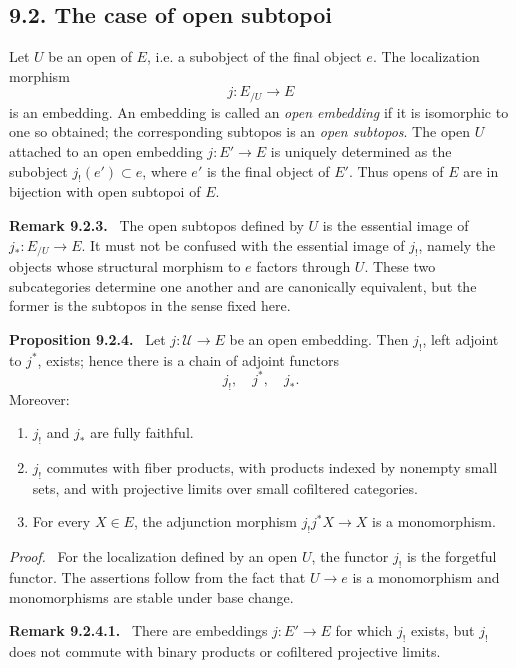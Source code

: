 \documentclass[11pt]{article}
\newcommand{\Uu}{\mathcal{U}}
\newenvironment{statement}[1]{\par\medskip\noindent\textbf{#1.}\ }{\par\medskip}
\newenvironment{remarktext}[1]{\par\medskip\noindent\textbf{#1.}\ }{\par\medskip}
\newenvironment{prooftext}{\par\noindent\emph{Proof.}\ }{\par\medskip}
\begin{document}
\subsection*{9.2. The case of open subtopoi}

Let \(U\) be an open of \(E\), i.e. a subobject of the final object \(e\). The localization morphism
\[
j:E_{/U}\longrightarrow E
\tag{9.2.2}
\]
is an embedding. An embedding is called an \emph{open embedding} if it is isomorphic to one so obtained; the corresponding subtopos is an \emph{open subtopos}. The open \(U\) attached to an open embedding \(j:E'\to E\) is uniquely determined as the subobject \(j_!(e')\subset e\), where \(e'\) is the final object of \(E'\). Thus opens of \(E\) are in bijection with open subtopoi of \(E\).

\begin{remarktext}{Remark 9.2.3}
The open subtopos defined by \(U\) is the essential image of \(j_*:E_{/U}\to E\). It must not be confused with the essential image of \(j_!\), namely the objects whose structural morphism to \(e\) factors through \(U\). These two subcategories determine one another and are canonically equivalent, but the former is the subtopos in the sense fixed here.
\end{remarktext}

\begin{statement}{Proposition 9.2.4}
Let \(j:\Uu\to E\) be an open embedding. Then \(j_!\), left adjoint to \(j^*\), exists; hence there is a chain of adjoint functors
\[
j_!,\quad j^*,\quad j_*.
\]
Moreover:
\begin{enumerate}[label=\alph*)]
\item \(j_!\) and \(j_*\) are fully faithful.
\item \(j_!\) commutes with fiber products, with products indexed by nonempty small sets, and with projective limits over small cofiltered categories.
\item For every \(X\in E\), the adjunction morphism \(j_!j^*X\to X\) is a monomorphism.
\end{enumerate}
\end{statement}

\begin{prooftext}
For the localization defined by an open \(U\), the functor \(j_!\) is the forgetful functor. The assertions follow from the fact that \(U\to e\) is a monomorphism and monomorphisms are stable under base change.
\end{prooftext}

\begin{remarktext}{Remark 9.2.4.1}
There are embeddings \(j:E'\to E\) for which \(j_!\) exists, but \(j_!\) does not commute with binary products or cofiltered projective limits.
\end{remarktext}
\end{document}
